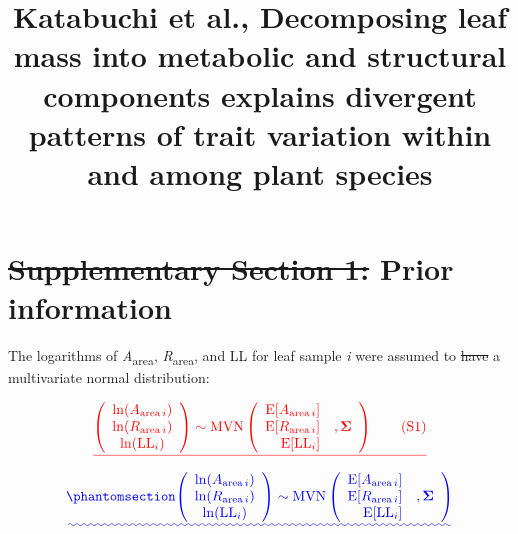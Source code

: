 \documentclass[
  12pt,
  letterpaper,
  DIV=11,
  numbers=noendperiod]{scrartcl}
\title{Katabuchi et al., Decomposing leaf mass into metabolic and
structural components explains divergent patterns of trait variation
within and among plant species}
\author{}
\date{}
\numberwithin{equation}{section} %
\renewcommand*\contentsname{Table of contents}
\newcommand\contentsname{Table of contents}
\providecommand{\DIFadd}[1]{{\protect\color{blue}\uwave{#1}}} %
\providecommand{\DIFdel}[1]{{\protect\color{red}\sout{#1}}}                      %
\providecommand{\DIFaddbegin}{} %
\providecommand{\DIFaddend}{} %
\providecommand{\DIFdelbegin}{} %
\providecommand{\DIFdelend}{} %
\newcommand{\DIFscaledelfig}{0.5}
\newlength{\DIFdelgraphicswidth} %
\newlength{\DIFdelgraphicsheight} %
\newcommand{\DIFaddincludegraphics}[2][]{{\color{blue}\fbox{\DIFOincludegraphics[#1]{#2}}}} %
\newcommand{\DIFdelincludegraphics}[2][]{%
\sbox{\DIFdelgraphicsbox}{\DIFOincludegraphics[#1]{#2}}%
\settoboxwidth{\DIFdelgraphicswidth}{\DIFdelgraphicsbox} %
\settoboxtotalheight{\DIFdelgraphicsheight}{\DIFdelgraphicsbox} %
\scalebox{\DIFscaledelfig}{%
\parbox[b]{\DIFdelgraphicswidth}{\usebox{\DIFdelgraphicsbox}\\[-\baselineskip] \rule{\DIFdelgraphicswidth}{0em}}\llap{\resizebox{\DIFdelgraphicswidth}{\DIFdelgraphicsheight}{%
\setlength{\unitlength}{\DIFdelgraphicswidth}%
\begin{picture}(1,1)%
\thicklines\linethickness{2pt} %
{\color[rgb]{1,0,0}\put(0,0){\framebox(1,1){}}}%
{\color[rgb]{1,0,0}\put(0,0){\line( 1,1){1}}}%
{\color[rgb]{1,0,0}\put(0,1){\line(1,-1){1}}}%
\end{picture}%
}\hspace*{3pt}}} %
} %
\DeclareRobustCommand{\DIFaddbegin}{\DIFOaddbegin \let\includegraphics\DIFaddincludegraphics} %
\DeclareRobustCommand{\DIFaddend}{\DIFOaddend \let\includegraphics\DIFOincludegraphics} %
\DeclareRobustCommand{\DIFdelbegin}{\DIFOdelbegin \let\includegraphics\DIFdelincludegraphics} %
\DeclareRobustCommand{\DIFdelend}{\DIFOaddend \let\includegraphics\DIFOincludegraphics} %
\begin{document}
\maketitle

\renewcommand*\contentsname{Table of contents}
{
\hypersetup{linkcolor=}
\setcounter{tocdepth}{3}
\tableofcontents
}

\DIFdelbegin %

\DIFdelend \section{\DIFdelbegin \DIFdel{Supplementary Section 1: }\DIFdelend Prior information}\DIFdelbegin %
\DIFdelend \DIFaddbegin \label{prior-information}
\DIFaddend 

The logarithms of \emph{A}\textsubscript{area},
\emph{R}\textsubscript{area}, and LL for leaf sample \emph{i} were
assumed to \DIFdelbegin \DIFdel{have }\DIFdelend \DIFaddbegin \DIFadd{follow }\DIFaddend a multivariate normal distribution:

\DIFdelbegin \[
\DIFdel{\begin{aligned}
\left(
\begin{array}{ccc}
\mathrm{ln}(A_{\mathrm{area} \, i})\\
\mathrm{ln}(R_{\mathrm{area} \, i}) \\
\mathrm{ln}(\mathrm{LL}_i)
\end{array}
\right)
\sim \mathrm{MVN}
\left(
\begin{array}{rrr}
\mathrm{E}[A_{\mathrm{area} \, i}] & \\
\mathrm{E}[R_{\mathrm{area} \, i}] &, \boldsymbol{\Sigma}\\
\mathrm{E}[\mathrm{LL}_i] &
\end{array}
\right) \qquad(\mathrm{S}1)
\end{aligned}
}\]%
\DIFdelend \DIFaddbegin \begin{equation}\DIFadd{\phantomsection\label{eq-mvn}{
\begin{aligned}
\left(
\begin{array}{ccc}
\mathrm{ln}(A_{\mathrm{area} \, i})\\
\mathrm{ln}(R_{\mathrm{area} \, i}) \\
\mathrm{ln}(\mathrm{LL}_i)
\end{array}
\right)
\sim \mathrm{MVN}
\left(
\begin{array}{rrr}
\mathrm{E}[A_{\mathrm{area} \, i}] & \\
\mathrm{E}[R_{\mathrm{area} \, i}] &, \boldsymbol{\Sigma}\\
\mathrm{E}[\mathrm{LL}_i] &
\end{array}
\right)
\end{aligned}
}}\end{equation}\DIFaddend 
\end{document}
